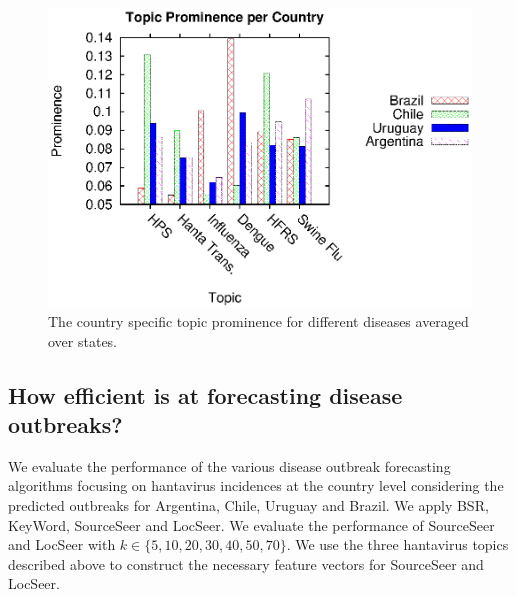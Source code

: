 \documentclass[twoside,leqno,twocolumn]{article}
\newcommand{\fullmodel}{{{\sf SourceSeer}}\xspace}
\newcommand{\locationmodel}{{\sf LocSeer}\xspace}
\newcommand{\keymodel}{{\sf KeyWord}\xspace}
\begin{document}
\begin{figure}[h]
\captionsetup{font=small}
\begin{center}
	\includegraphics[trim=5 0 10 10, clip,scale=0.5]{fig/country_topic.eps}
\end{center}
 \vspace{-10pt}
\caption{The country specific topic prominence for different diseases averaged over states.}
 \label{fig:country_topic}
 \vspace{-20pt}
\end{figure}

\subsection{How efficient is {} at forecasting disease outbreaks?} We evaluate the performance of the various disease outbreak forecasting algorithms focusing on hantavirus incidences at the country level considering the predicted outbreaks for Argentina, Chile, Uruguay and Brazil.  We apply BSR,  \keymodel, \fullmodel and \locationmodel. We evaluate the performance of \fullmodel and \locationmodel with $k \in \{5,10,20,30,40,50,70\}$. We use the three hantavirus topics described above to construct the necessary feature vectors for \fullmodel and \locationmodel.  
\end{document}

